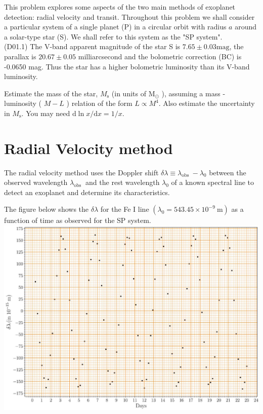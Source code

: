 \documentclass[10pt]{article}
\begin{document}
    This problem explores some aspects of the two main methods of exoplanet detection: radial velocity and transit. Throughout this problem we shall consider a particular system of a single planet (P) in a circular orbit with radius $a$ around a solar-type star (S). We shall refer to this system as the "SP system".\\
    (D01.1) The V-band apparent magnitude of the star S is $7.65 \pm 0.03 \mathrm{mag}$, the parallax is $20.67 \pm 0.05$ milliarcsecond and the bolometric correction (BC) is -0.0650 mag. Thus the star has a higher bolometric luminosity than its V-band luminosity.
    
    Estimate the mass of the star, $M_{\mathrm{s}}$ (in units of $\mathrm{M}_{\odot}$ ), assuming a mass - luminosity ( $M-L$ ) relation of the form $L \propto M^{4}$. Also estimate the uncertainty in $M_{\mathrm{s}}$. You may need $\mathrm{d} \ln x / \mathrm{d} x=1 / x$.
    
    \section*{Radial Velocity method}
    The radial velocity method uses the Doppler shift $\delta \lambda \equiv \lambda_{\text {obs }}-\lambda_{0}$ between the observed wavelength $\lambda_{\text {obs }}$ and the rest wavelength $\lambda_{0}$ of a known spectral line to detect an exoplanet and determine its characteristics.
    
    The figure below shows the $\delta \lambda$ for the Fe I line $\left(\lambda_{0}=543.45 \times 10^{-9} \mathrm{~m}\right)$ as a function of time as observed for the SP system.\\
    \includegraphics[max width=\textwidth, center]{2025_08_23_9a7c688c47c330d7bfc8g-1}
    
\end{document}
